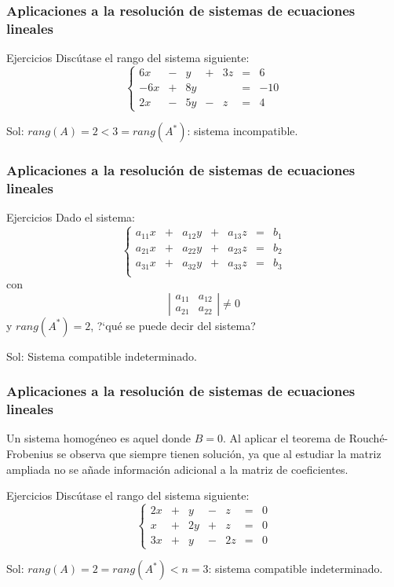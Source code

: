 \documentclass[12pt]{article}
\begin{document}
     \begin{frame}
  \frametitle{Aplicaciones a la resoluci\'on de sistemas de ecuaciones lineales}
     \begin{block}{Ejercicios}
Disc\'utase el rango del sistema siguiente:
\[
\left\{\begin{array}{ccccccc}6x & - & y & + & 3z & = & 6 \\-6x & + & 8y &   &   & = & -10 \\2x & - & 5y & - & z & = & 4\end{array}\right.
\]
\end{block}
Sol: $rang(A)=2<3=rang(A^*)$: sistema incompatible.
\end{frame} 
  
  
  
       \begin{frame}
  \frametitle{Aplicaciones a la resoluci\'on de sistemas de ecuaciones lineales}
     \begin{block}{Ejercicios}
Dado el sistema: 
\[
\left\{\begin{array}{ccccccc}
a_{11}x &+ & a_{12}y & + & a_{13}z & = & b_1 \\
a_{21}x &+ & a_{22}y & + & a_{23}z & = & b_2 \\
a_{31}x &+ & a_{32}y & + & a_{33}z & = & b_3 \\
\end{array}\right.
\]
con 
\[\left|
\begin{array}{cc}
a_{11}&a_{12}\\a_{21}&a_{22}
\end{array}
\right|\neq0\]
y $rang(A^*) = 2$, ?`qu\'e se puede decir del sistema?
\end{block}
Sol: Sistema compatible indeterminado.
\end{frame} 
  
  
       \begin{frame}
  \frametitle{Aplicaciones a la resoluci\'on de sistemas de ecuaciones lineales}
  Un sistema homog\'eneo es aquel donde $B=0$. Al aplicar el teorema de Rouch\'e-Frobenius se observa que siempre tienen soluci\'on, ya que al estudiar la matriz ampliada no se a\~nade informaci\'on adicional a la matriz de coeficientes.
     \begin{block}{Ejercicios}
Disc\'utase el rango del sistema siguiente:
\[
\left\{\begin{array}{ccccccc}2x & + & y & - & z & = & 0 \\
x & + & 2y & +  & z  & = & 0 \\
3x & + & y & - & 2z & = & 0\end{array}\right.
\]
\end{block}
Sol: $rang(A)=2=rang(A^*)<n=3$: sistema compatible indeterminado.
\end{frame} 
  
\end{document}
